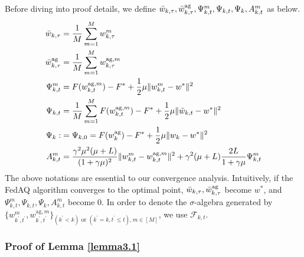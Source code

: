 \documentclass[11pt]{article}
\begin{document}
Before diving into proof details, we define $\Bar{w}_{k, \tau}, \Bar{w}_{k, \tau}^{\textrm{ag}}, \Psi_{k, t}^m, \Psi_{k, t}, \Psi_k, A_{k, t}^m$ as below.
\begin{align*}
    \Bar{w}_{k, \tau} &= \frac{1}{M} \sum_{m=1}^M w_{k, \tau}^m \\
    \Bar{w}_{k, \tau}^{\textrm{ag}} &= \frac{1}{M} \sum_{m=1}^M w_{k, \tau}^{\textrm{ag}, m} \\
    \Psi_{k, t}^m &= F(w_{k, t}^{\textrm{ag}, m}) - F^* + \frac{1}{2} \mu \|w_{k, t}^m - w^*\|^2\\
    \Psi_{k, t} &= \frac{1}{M} \sum_{m=1}^M F(w_{k, t}^{\textrm{ag}, m}) -F^* + \frac{1}{2} \mu \|\Bar{w}_{k, t} - w^*\|^2 \\
    \Psi_k :&= \Psi_{k, 0} = F(w_k^{\textrm{ag}}) - F^* + \frac{1}{2} \mu \|w_k - w^*\|^2\\
    A_{k, t}^m &= \frac{\gamma^2\mu^2 (\mu+L)}{(1+\gamma\mu)^2}\|w_{k, t}^m - w_{k, t}^{\textrm{ag}, m}\|^2 + \gamma^2(\mu + L)\frac{2L}{1+\gamma\mu}\Psi_{k, t}^m
\end{align*}
The above notations are essential to our convergence analysis. Intuitively, if the FedAQ algorithm converges to the optimal point, $\Bar{w}_{k, \tau}, \Bar{w}_{k, \tau}^{\textrm{ag}}$ become $w^*$, and $\Psi_{k, t}^m, \Psi_{k, t}, \Psi_k, A_{k, t}^m$ become 0. In order to denote the $\sigma$-algebra generated by $\{w_{k^\prime, t^\prime}^m, w_{k^\prime, t^\prime}^{\textrm{ag}, m}\}_{(k^\prime < k) \textrm{ or } (k^\prime = k, t^\prime \leq t), m \in [M]}$, we use $\mathcal{F}_{k, t}$.

\subsubsection{Proof of Lemma \ref{lemma3.1}}
\label{app:proof_lemma}
\end{document}

